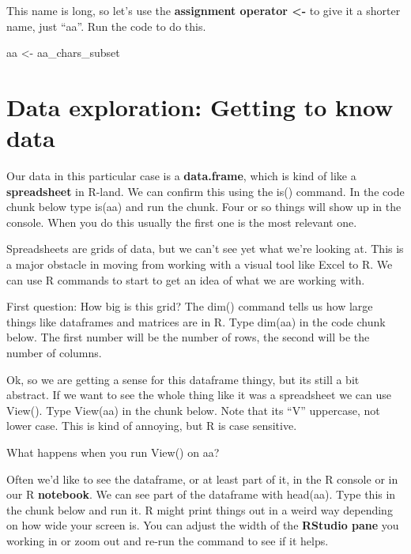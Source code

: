 \documentclass[
]{book}
\newenvironment{Shaded}{\begin{snugshade}}{\end{snugshade}}
\newcommand{\NormalTok}[1]{#1}
\newcommand{\OtherTok}[1]{\textcolor[rgb]{0.56,0.35,0.01}{#1}}
\begin{document}
This name is long, so let's use the \textbf{assignment operator \textless-} to give it a shorter name, just ``aa''. Run the code to do this.

\begin{Shaded}
\begin{Highlighting}[]
\NormalTok{aa  }\OtherTok{\textless{}{-}}\NormalTok{  aa\_chars\_subset}
\end{Highlighting}
\end{Shaded}

\hypertarget{data-exploration-getting-to-know-data}{%
\section{Data exploration: Getting to know data}\label{data-exploration-getting-to-know-data}}

Our data in this particular case is a \textbf{data.frame}, which is kind of like a \textbf{spreadsheet} in R-land. We can confirm this using the is() command. In the code chunk below type is(aa) and run the chunk. Four or so things will show up in the console. When you do this usually the first one is the most relevant one.

Spreadsheets are grids of data, but we can't see yet what we're looking at. This is a major obstacle in moving from working with a visual tool like Excel to R. We can use R commands to start to get an idea of what we are working with.

First question: How big is this grid? The dim() command tells us how large things like dataframes and matrices are in R. Type dim(aa) in the code chunk below. The first number will be the number of rows, the second will be the number of columns.

Ok, so we are getting a sense for this dataframe thingy, but its still a bit abstract. If we want to see the whole thing like it was a spreadsheet we can use View(). Type View(aa) in the chunk below. Note that its ``V'' uppercase, not lower case. This is kind of annoying, but R is case sensitive.

What happens when you run View() on aa?

Often we'd like to see the dataframe, or at least part of it, in the R console or in our R \textbf{notebook}. We can see part of the dataframe with head(aa). Type this in the chunk below and run it. R might print things out in a weird way depending on how wide your screen is. You can adjust the width of the \textbf{RStudio pane} you working in or zoom out and re-run the command to see if it helps.
\end{document}
